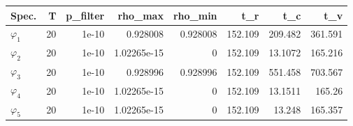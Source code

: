\begin{tabular}{lrrrrrrr}
\toprule
Spec. & T & p_filter & rho_max & rho_min & t_r & t_c & t_v \\
\midrule
$\varphi_1$ & 20 & 1e-10 & 0.928008 & 0.928008 & 152.109 & 209.482 & 361.591 \\
$\varphi_2$ & 20 & 1e-10 & 1.02265e-15 & 0 & 152.109 & 13.1072 & 165.216 \\
$\varphi_3$ & 20 & 1e-10 & 0.928996 & 0.928996 & 152.109 & 551.458 & 703.567 \\
$\varphi_4$ & 20 & 1e-10 & 1.02265e-15 & 0 & 152.109 & 13.1511 & 165.26 \\
$\varphi_5$ & 20 & 1e-10 & 1.02265e-15 & 0 & 152.109 & 13.248 & 165.357 \\
\bottomrule
\end{tabular}
